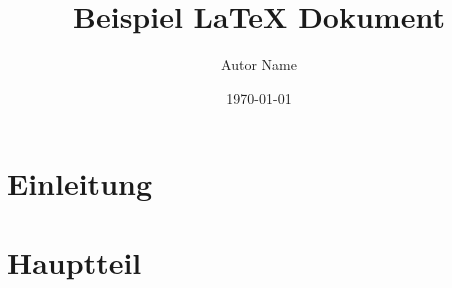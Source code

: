 \documentclass{article}
\title{Beispiel LaTeX Dokument}
\author{Autor Name}
\date{\today}
\begin{document}
\maketitle

\section{Einleitung}
\lipsum[1-2] %

\section{Hauptteil}
\lipsum[3-4] %
\end{document}
